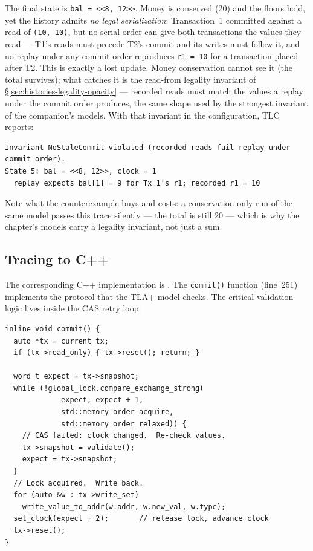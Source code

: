 The final state is \texttt{bal = <<8, 12>>}.  Money is conserved (20) and
the floors hold, yet the history admits \emph{no legal serialization}:
Transaction~1 committed against a read of \texttt{(10, 10)}, but no serial
order can give both transactions the values they read --- T1's reads must
precede T2's commit and its writes must follow it, and no replay under any
commit order reproduces \texttt{r1 = 10} for a transaction placed after
T2.  This is exactly a lost update.  Money conservation cannot see it (the
total survives); what catches it is the read-from legality invariant of
\S\ref{sec:histories-legality-opacity} --- recorded reads must match the
values a replay under the commit order produces, the same shape used by the
strongest invariant of the companion's models.  With that invariant in the
configuration, TLC reports:

\begin{lstlisting}[caption={TLC counterexample output (simplified).}]
Invariant NoStaleCommit violated (recorded reads fail replay under commit order).
State 5: bal = <<8, 12>>, clock = 1
  replay expects bal[1] = 9 for Tx 1's r1; recorded r1 = 10
\end{lstlisting}

Note what the counterexample buys and costs: a conservation-only run of the
same model passes this trace silently --- the total is still 20 --- which
is why the chapter's models carry a legality invariant, not just a sum.

\subsection{Tracing to C++}

The corresponding C++ implementation is
.
The \texttt{commit()} function (line~251) implements the protocol that
the TLA+ model checks.  The critical validation logic lives inside the
CAS retry loop:

\begin{lstlisting}[caption={Simplified NOrec commit path (\texttt{NOrec.hpp:251}).}]
inline void commit() {
  auto *tx = current_tx;
  if (tx->read_only) { tx->reset(); return; }

  word_t expect = tx->snapshot;
  while (!global_lock.compare_exchange_strong(
             expect, expect + 1,
             std::memory_order_acquire,
             std::memory_order_relaxed)) {
    // CAS failed: clock changed.  Re-check values.
    tx->snapshot = validate();
    expect = tx->snapshot;
  }
  // Lock acquired.  Write back.
  for (auto &w : tx->write_set)
    write_value_to_addr(w.addr, w.new_val, w.type);
  set_clock(expect + 2);       // release lock, advance clock
  tx->reset();
}
\end{lstlisting}

